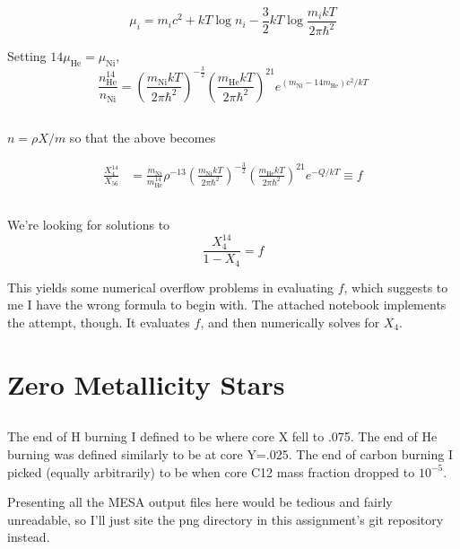 \documentclass[12pt]{article}
\newcommand{\pfrac}[2]{\left(\frac{#1}{#2} \right)}
\begin{document}
\[ \mu_i = m_i c^2 + kT \log{n_i} - \frac{3}{2}kT\log{\frac{m_i kT}{2\pi\hbar^2}}
\]


\newcommand{\muhe}{\mu_{\mathrm{He}}}
\newcommand{\muni}{\mu_{\mathrm{Ni}}}
\newcommand{\mhe}{m_{\mathrm{He}}}
\newcommand{\mni}{m_{\mathrm{Ni}}}
\newcommand{\nhe}{n_{\mathrm{He}}}
\newcommand{\nni}{n_{\mathrm{Ni}}}

Setting \(14\muhe = \muni\),
\[
\frac{\nhe^{14}}{\nni} = \pfrac{\mni kT}{2\pi\hbar^2}^{-\frac{3}{2}}\pfrac{\mhe kT}{2\pi\hbar^2}^{21} e^{(\mni-14\mhe)c^2/kT}
\]

\subsection{}

\( n = \rho X / m  \) so that the above becomes

\begin{align*}
\frac{X_{4}^{14}}{X_{56}} &= \frac{\mni}{\mhe^{14}}\rho^{-13}\pfrac{\mni kT}{2\pi\hbar^2}^{-\frac{3}{2}}\pfrac{\mhe kT}{2\pi\hbar^2}^{21} e^{-Q/kT} \equiv f
\end{align*}

\subsection{}

We're looking for solutions to
\[ \frac{X_4^{14}}{1-X_4} = f
\]

This yields some numerical overflow problems in evaluating \(f\), which suggests to me I have the wrong formula to begin with. The attached notebook implements the attempt, though. It evaluates \(f\), and then numerically solves for \(X_4\).

\section{Zero Metallicity Stars}

\subsection{}

The end of H burning I defined to be where core X fell to .075. The end of He burning was defined similarly to be at core Y=.025. The end of carbon burning I picked (equally arbitrarily) to be when core C12 mass fraction dropped to \(10^{-5}\). 

Presenting all the MESA output files here would be tedious and fairly unreadable, so I'll just site the png directory in this assignment's git repository instead.
\end{document}
